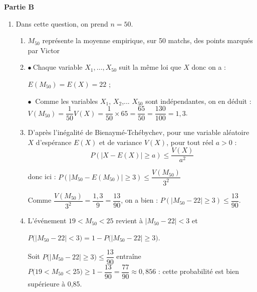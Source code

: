\medskip

\textbf{Partie B}

\medskip



















\begin{enumerate}
\item Dans cette question, on prend $n = 50$.

	\begin{enumerate}
		\item 
$M_{50}$ représente la moyenne empirique, sur 50 matchs, des points marqués par Victor
		\item 
$\bullet~$Chaque variable $X_1,\ldots, X_{50}$ suit la même loi que $X$ donc on a :

{$E(M_{50}) = E (X) = 22$ ;}

$\bullet~$ Comme les variables $X_1$, $X_2$,... $X_50$ sont indépendantes, on en déduit : \quad $V(M_{50}) = \dfrac{1}{50}V(X) = \dfrac{1}{50} \times 65 = \dfrac{65}{50} = \dfrac{130}{100} = 1,3$.

		\item 
D'après l'inégalité de Bienaymé-Tchébychev, pour une variable aléatoire $X$  d’espérance $E(X)$ et de variance $V (X)$,  pour tout réel $a > 0$ :
		$$P(|X - E(X)|\geqslant a) \leqslant \dfrac{V(X)}{a^2}$$

donc  ici  : $P(|M_{50} - E(M_{50})| \geqslant 3) \leqslant \dfrac{V(M_{50})}{3^2}$



Comme $\dfrac{V(M_{50})}{3^2} = \dfrac{1,3}{9} = \dfrac{13}{90}$, on a bien  :  $P\left(\left|M_{50}- 22\right| \geqslant 3\right) \leqslant \dfrac{13}{90}$.



		\item 
		L'événement \og  $19 <M_{50}< 25$ \fg{} revient à $\left|M_{50} - 22 \right| < 3$ et

$P\big(\left|M_{50} - 22 \right| < 3\big) = 1 - P\big(\left|M_{50} - 22 \right| \geqslant 3\big)$.

Soit $P\big(\left|M_{50} - 22 \right| \geqslant 3\big) \leqslant \dfrac{13}{90}$ entraîne $P\big(19 < M_{50} < 25 \big) \geqslant 1 - \dfrac{13}{90} = \dfrac{77}{90} \approx 0,856$ : cette probabilité est bien supérieure à 0,85.
	\end{enumerate}



\end{enumerate}
